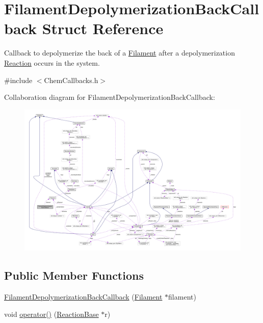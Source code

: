 \hypertarget{structFilamentDepolymerizationBackCallback}{\section{Filament\+Depolymerization\+Back\+Callback Struct Reference}
\label{structFilamentDepolymerizationBackCallback}
}


Callback to depolymerize the back of a \hyperlink{classFilament}{Filament} after a depolymerization \hyperlink{classReaction}{Reaction} occurs in the system.  




{\ttfamily \#include $<$Chem\+Callbacks.\+h$>$}



Collaboration diagram for Filament\+Depolymerization\+Back\+Callback\+:
\nopagebreak
\begin{figure}[H]
\begin{center}
\leavevmode
\includegraphics[width=350pt]{structFilamentDepolymerizationBackCallback__coll__graph}
\end{center}
\end{figure}
\subsection*{Public Member Functions}
\begin{DoxyCompactItemize}
\item 
\hyperlink{structFilamentDepolymerizationBackCallback_a91efa0834368247e539ceb5dce45d34c}{Filament\+Depolymerization\+Back\+Callback} (\hyperlink{classFilament}{Filament} $\ast$filament)
\item 
void \hyperlink{structFilamentDepolymerizationBackCallback_a3766bd45ea6005645508cf2a96589a52}{operator()} (\hyperlink{classReactionBase}{Reaction\+Base} $\ast$r)
\end{DoxyCompactItemize}
